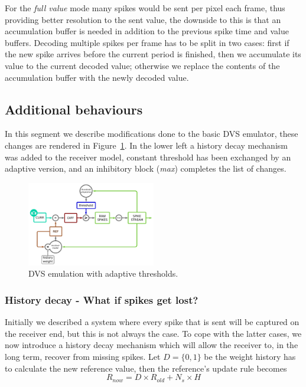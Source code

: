 \documentclass[twocolumn]{article}
\begin{document}
For the \textit{full value} mode many spikes would be sent per pixel each frame, thus providing better resolution to the sent value, the downside to this is that an accumulation buffer is needed in addition to the previous spike time and value buffers. Decoding multiple spikes per frame has to be split in two cases: first if the new spike arrives before the current period is finished, then we accumulate its value to the current decoded value; otherwise we replace the contents of the accumulation buffer with the newly decoded value.


\subsection{Additional behaviours}

In this segment we describe modifications done to the basic DVS emulator, these changes are rendered in Figure~\ref{fig:dvs_emu_inh}. In the lower left a history decay mechanism was added to the receiver model, constant threshold has been exchanged by an adaptive version, and an inhibitory block (\textit{\textsf{max}}) completes the list of changes.

\begin{figure}[htb]
  
  \includegraphics[width=0.5\textwidth]{dvs_emu_decay_adapt_inh}
  \caption{DVS emulation with adaptive thresholds.}
  \label{fig:dvs_emu_inh}
\end{figure}

\subsubsection{History decay - What if spikes get lost?}

Initially we described a system where every spike that is sent will be captured on the receiver end, but this is not always the case. To cope with the latter cases, we now introduce a history decay mechanism which will allow the receiver to, in the long term, recover from missing spikes. Let $D = \{0, 1\}$ be the weight history has to calculate the new reference value, then the reference's update rule becomes
\begin{equation}
\label{eq:ref_update_decay}
R_{now} = D\times R_{old} + N_{s}\times H
\end{equation}
\end{document}
